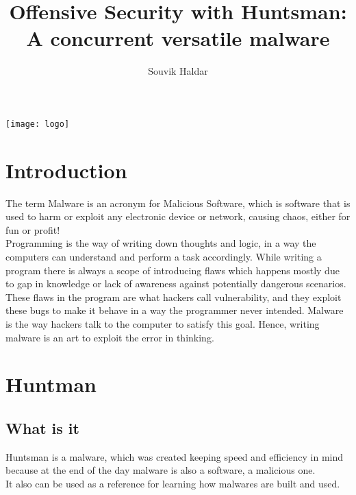 \documentclass[12pt]{article}
\title{Offensive Security with Huntsman: A concurrent versatile malware}
\author{Souvik Haldar}
\begin{document}
\maketitle
\texttt{[image: logo]}

\section{Introduction}
The term Malware is an acronym for Malicious Software, which is software that is used to harm or exploit any electronic device or network, causing chaos, either for fun or profit!\\
Programming is the way of writing down thoughts and logic, in a way the computers can understand and perform a task accordingly. While writing a program there is always a scope of introducing flaws which happens mostly due to gap in knowledge or lack of awareness against potentially dangerous scenarios. These flaws in the program are what hackers call vulnerability, and they exploit these bugs to make it behave in a way the programmer never intended. Malware is the way hackers talk to the computer to satisfy this goal. Hence, writing malware is an art to exploit the error in thinking. 

\section{Huntman}
\subsection{What is it} 
Huntsman is a malware, which was created keeping speed and efficiency in mind because at the end of the day malware is also a software, a malicious one.\\ 
It also can be used as a reference for learning how malwares are built and used. 
\end{document}
